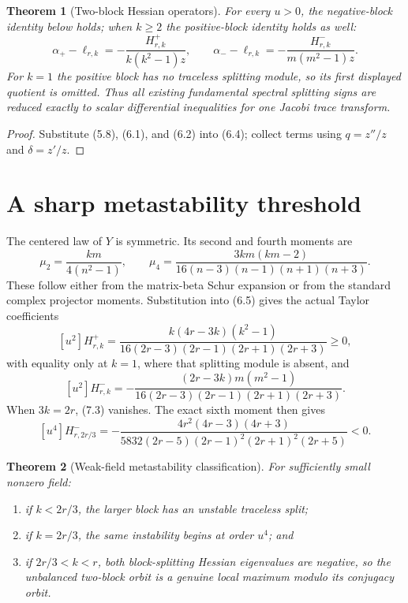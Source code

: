 \documentclass[11pt]{article}
\newtheorem{theorem}{Theorem}[section]
\begin{document}
\begin{theorem}[Two-block Hessian operators]\label{thm:hess}
For every $u>0$, the negative-block identity below holds; when $k\ge2$ the
positive-block identity holds as well:
\[
 \boxed{
 \alpha_+-\ell_{r,k}=-\frac{H_{r,k}^{+}}{k(k^2-1)z},\qquad
 \alpha_--\ell_{r,k}=-\frac{H_{r,k}^{-}}{m(m^2-1)z}.}       \tag{6.6}
\]
For $k=1$ the positive block has no traceless splitting module, so its first
displayed quotient is omitted.  Thus all existing fundamental spectral
splitting signs are reduced exactly to scalar differential inequalities for
one Jacobi trace transform.
\end{theorem}

\begin{proof}
Substitute (5.8), (6.1), and (6.2) into
(6.4); collect terms using $q=z''/z$ and $\delta=z'/z$.
\end{proof}

\section{A sharp metastability threshold}

The centered law of $Y$ is symmetric.  Its second and fourth moments are
\[
 \mu_2=\frac{km}{4(n^2-1)},\qquad
 \mu_4=\frac{3km(km-2)}
 {16(n-3)(n-1)(n+1)(n+3)}.                                  \tag{7.1}
\]
These follow either from the matrix-beta Schur expansion or from the standard
complex projector moments.  Substitution into (6.5) gives the actual
Taylor coefficients
\[
 [u^2]H_{r,k}^{+}
 =\frac{k(4r-3k)(k^2-1)}
 {16(2r-3)(2r-1)(2r+1)(2r+3)}\ge0,                          \tag{7.2}
\]
with equality only at $k=1$, where that splitting module is absent,
and
\[
 [u^2]H_{r,k}^{-}
 =-\frac{(2r-3k)m(m^2-1)}
 {16(2r-3)(2r-1)(2r+1)(2r+3)}.                              \tag{7.3}
\]
When $3k=2r$, (7.3) vanishes.  The exact sixth moment then gives
\[
 [u^4]H_{r,2r/3}^{-}
 =-\frac{4r^2(4r-3)(4r+3)}
 {5832(2r-5)(2r-1)^2(2r+1)^2(2r+5)}<0.                     \tag{7.4}
\]

\begin{theorem}[Weak-field metastability classification]\label{thm:meta}
For sufficiently small nonzero field:
\begin{enumerate}[label=(\roman*)]
\item if $k<2r/3$, the larger block has an unstable traceless split;
\item if $k=2r/3$, the same instability begins at order $u^4$; and
\item if $2r/3<k<r$, both block-splitting Hessian eigenvalues are negative,
so the unbalanced two-block orbit is a genuine local maximum modulo its
conjugacy orbit.
\end{enumerate}
\end{theorem}
\end{document}
